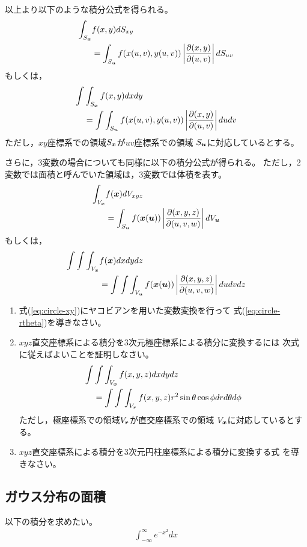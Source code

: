 \documentclass[twocolumn,11pt]{jarticle}
\begin{document}
以上より以下のような積分公式を得られる。
\begin{align}
  \int_{S_{\boldsymbol{x}}}&f(x,y)dS_{xy}\notag\\
  &=\int_{S_{\boldsymbol{u}}}f(x(u,v),y(u,v))\left|\frac{\partial(x,y)}{\partial(u,v)}\right|dS_{uv}\notag
\end{align}
もしくは，
\begin{align}
  \int&\int_{S_{\boldsymbol{x}}}f(x,y)dxdy\notag\\
  &=\int\int_{S_{\boldsymbol{u}}}f(x(u,v),y(u,v))\left|\frac{\partial(x,y)}{\partial(u,v)}\right|dudv\notag
\end{align}
ただし，$xy$座標系での領域$S_{\boldsymbol{x}}$が$uv$座標系での領域
$S_{\boldsymbol{u}}$に対応しているとする。

さらに，3変数の場合についても同様に以下の積分公式が得られる。
ただし，2変数では面積と呼んでいた領域は，3変数では体積を表す。
\begin{align}
  \int_{V_{\boldsymbol{x}}}&f(\boldsymbol{x})dV_{xyz}\notag\\
  &=\int_{S_{\boldsymbol{u}}}f(\boldsymbol{x}(\boldsymbol{u}))
  \left|\frac{\partial(x,y,z)}{\partial(u,v,w)}\right|dV_{\boldsymbol{u}}\notag
\end{align}
もしくは，
\begin{align}
  \int\int\int_{V_{\boldsymbol{x}}}&f(\boldsymbol{x})dxdydz\notag\\
  &=\int\int\int_{V_{\boldsymbol{u}}}f(\boldsymbol{x}(\boldsymbol{u}))\left|\frac{\partial(x,y,z)}{\partial(u,v,w)}\right|dudvdz\notag
\end{align}

\question
\begin{enumerate}
\item 式(\ref{eq:circle-xy})にヤコビアンを用いた変数変換を行って
式(\ref{eq:circle-rtheta})を導きなさい。
\item $xyz$直交座標系による積分を3次元極座標系による積分に変換するには
  次式に従えばよいことを証明しなさい。
  \begin{align}
    \int&\int\int_{V_{\boldsymbol{x}}}f(x,y,z)dxdydz\notag\\
    &= \int\int\int_{V_{\boldsymbol{r}}}f(x,y,z)r^2\sin\theta\cos\phi dr d\theta d\phi\notag
  \end{align}
  ただし，極座標系での領域$V_{\boldsymbol{r}}$が直交座標系での領域
    $V_{\boldsymbol{x}}$に対応しているとする。
\item $xyz$直交座標系による積分を3次元円柱座標系による積分に変換する式
  を導きなさい。
\end{enumerate}%

\subsection{ガウス分布の面積}
以下の積分を求めたい。
\begin{align}
  \label{eq:int_e}
  \int_{-\infty}^{\infty}e^{-x^2}dx
\end{align}
\end{document}
